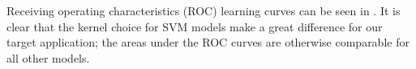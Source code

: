 Receiving operating characteristics (ROC) learning curves can be seen in . It is clear that the kernel choice for SVM models make a great difference for our target application; the areas under the ROC curves are otherwise comparable for all other models.





